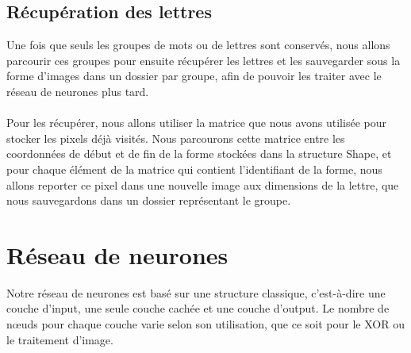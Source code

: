 \documentclass{article}
\begin{document}
\subsection{Récupération des lettres}

Une fois que seuls les groupes de mots ou de lettres sont conservés, nous allons parcourir ces groupes pour ensuite récupérer les lettres et les sauvegarder sous la forme d'images dans un dossier par groupe, afin de pouvoir les traiter avec le réseau de neurones plus tard.
\\\\
Pour les récupérer, nous allons utiliser la matrice que nous avons utilisée pour stocker les pixels déjà visités. Nous parcourons cette matrice entre les coordonnées de début et de fin de la forme stockées dans la structure Shape, et pour chaque élément de la matrice qui contient l'identifiant de la forme, nous allons reporter ce pixel dans une nouvelle image aux dimensions de la lettre, que nous sauvegardons dans un dossier représentant le groupe.


\section{Réseau de neurones}

Notre réseau de neurones est basé sur une structure classique, c'est-à-dire une couche d'input, une seule couche cachée et une couche d'output. Le nombre de nœuds pour chaque couche varie selon son utilisation, que ce soit pour le XOR ou le traitement d'image.
\end{document}
